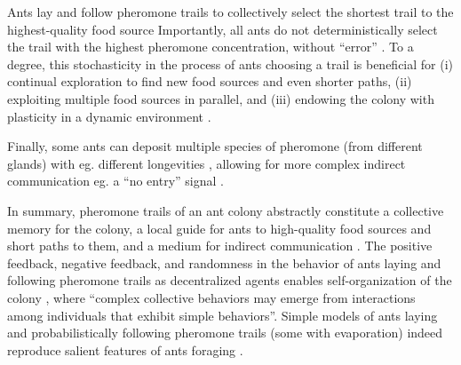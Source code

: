 \documentclass[11pt, oneside]{article}
\begin{document}
\begin{mybox}[label=box:ants, breakable]{Ants lay and follow pheromone trails to collectively select the shortest trail to the highest-quality food source}
Importantly, all ants do not deterministically select the trail with the highest pheromone concentration, without ``error'' \cite{deneubourg1990self}.
To a degree, this stochasticity in the process of ants choosing a trail is beneficial for (i) continual exploration to find new food sources and even shorter paths, 
(ii) exploiting multiple food sources in parallel, 
and 
(iii) endowing the colony with plasticity in a dynamic environment \cite{deneubourg1983probabilistic,shiraishi2019diverse,deneubourg1986random,dussutour2009noise,edelstein1995trail}.

Finally, some ants can deposit multiple species of pheromone (from different glands) with eg. different longevities \cite{czaczkes2015trail}, allowing for more complex indirect communication \cite{jackson2006communication} eg. a ``no entry'' signal \cite{robinson2005no}. 

In summary, pheromone trails of an ant colony abstractly constitute a collective memory for the colony, a local guide for ants to high-quality food sources and short paths to them, and a medium for indirect communication \cite{jackson2006communication}. 
The positive feedback, negative feedback, and randomness in the behavior of ants laying and following pheromone trails as decentralized agents enables self-organization of the colony \cite{bonabeau1997self}, where ``complex collective behaviors may emerge from interactions among individuals that exhibit simple behaviors''.
Simple models of ants laying and probabilistically following pheromone trails (some with evaporation) indeed reproduce salient features of ants foraging \cite{bonabeau1999swarm,goss1989self,jackson2006communication,edelstein1995trail,watmough1995modelling}.
\end{mybox}
\end{document}
